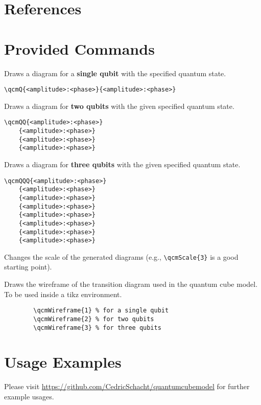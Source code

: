 \documentclass{article}
\begin{document}
\section*{References}


\section*{Provided Commands}

\begin{description}
    \item Draws a diagram for a \textbf{single qubit} with the specified quantum state.
    \begin{verbatim}
\qcmQ{<amplitude>:<phase>}{<amplitude>:<phase>}
    \end{verbatim}

    \item Draws a diagram for \textbf{two qubits} with the given specified quantum state.
    \begin{verbatim}
\qcmQQ{<amplitude>:<phase>}
    {<amplitude>:<phase>}
    {<amplitude>:<phase>}
    {<amplitude>:<phase>}
    \end{verbatim}

    \item  Draws a diagram for \textbf{three qubits} with the given specified quantum state.
    \begin{verbatim}
\qcmQQQ{<amplitude>:<phase>}
    {<amplitude>:<phase>}
    {<amplitude>:<phase>}
    {<amplitude>:<phase>}
    {<amplitude>:<phase>}
    {<amplitude>:<phase>}
    {<amplitude>:<phase>}
    {<amplitude>:<phase>}
    \end{verbatim}

  
    \item Changes the scale of the generated diagrams (e.g., \verb|\qcmScale{3}| is a good starting point).
  
    \item Draws the wireframe of the transition diagram used in the quantum cube model.
        To be used inside a tikz environment.
    \begin{verbatim}
        \qcmWireframe{1} % for a single qubit
        \qcmWireframe{2} % for two qubits
        \qcmWireframe{3} % for three qubits
    \end{verbatim}
\end{description}

\section*{Usage Examples}
Please visit \href{https://github.com/CedricSchacht/quantumcubemodel}{https://github.com/CedricSchacht/quantumcubemodel}
for further example usages.
\end{document}
